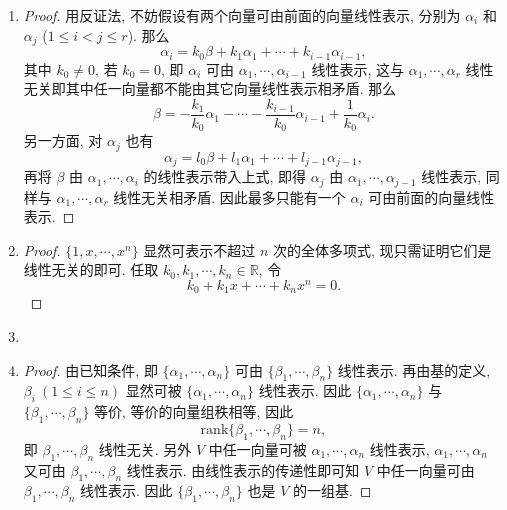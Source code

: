 \documentclass[a4paper, 11pt]{ctexart}
\begin{document}
\begin{enumerate}
    \item %
        \begin{proof}
            用反证法, 不妨假设有两个向量可由前面的向量线性表示, 分别为 $\alpha_i$ 和 $\alpha_j$ ($1 \leq i < j \leq r$). 那么
            \[
                \alpha_i = k_0\beta + k_1\alpha_1 + \cdots + k_{i-1}\alpha_{i-1},    
            \]
            其中 $k_0 \not= 0$, 若 $k_0 = 0$, 即 $\alpha_i$ 可由 $\alpha_1, \cdots, \alpha_{i-1}$ 线性表示,
            这与 $\alpha_1, \cdots, \alpha_r$ 线性无关即其中任一向量都不能由其它向量线性表示相矛盾.
            那么
            \[
                \beta = - \frac{k_1}{k_0}\alpha_1 - \cdots - \frac{k_{i-1}}{k_0}\alpha_{i-1} + \frac{1}{k_0}\alpha_i.
            \]
            另一方面, 对 $\alpha_j$ 也有
            \[
                \alpha_j = l_0\beta + l_1\alpha_1 + \cdots + l_{j-1}\alpha_{j-1},    
            \]
            再将 $\beta$ 由 $\alpha_1, \cdots, \alpha_i$ 的线性表示带入上式, 即得 $\alpha_j$ 由 $\alpha_1, \cdots, \alpha_{j-1}$ 线性表示, 同样与 $\alpha_1, \cdots, \alpha_r$ 线性无关相矛盾.
            因此最多只能有一个 $\alpha_i$ 可由前面的向量线性表示.
        \end{proof}
    \item %
        \begin{proof}
            $\{1, x, \cdots, x^n\}$ 显然可表示不超过 $n$ 次的全体多项式, 现只需证明它们是线性无关的即可. 任取 $k_0, k_1, \cdots, k_n \in \mathbb{R}$, 令
            \[
                k_0 + k_1x + \cdots + k_nx^n = 0.    
            \]
        \end{proof}
    \item %
    \item %
        \begin{proof}
            由已知条件, 即 $\{\alpha_1, \cdots, \alpha_n\}$ 可由 $\{\beta_1, \cdots, \beta_n\}$ 线性表示. 再由基的定义, $\beta_i\ (1\leq i \leq n)$ 显然可被 $\{\alpha_1, \cdots, \alpha_n\}$ 线性表示.
            因此 $\{\alpha_1, \cdots, \alpha_n\}$ 与 $\{\beta_1, \cdots, \beta_n\}$ 等价, 等价的向量组秩相等, 因此
            \[
                \mathrm{rank}\{\beta_1, \cdots, \beta_n\} = n,
            \]
            即 $\beta_1, \cdots, \beta_n$ 线性无关. 另外 $V$ 中任一向量可被 $\alpha_1, \cdots, \alpha_n$ 线性表示, $\alpha_1, \cdots, \alpha_n$ 又可由 $\beta_1, \cdots, \beta_n$ 线性表示.
            由线性表示的传递性即可知 $V$ 中任一向量可由 $\beta_1, \cdots, \beta_n$ 线性表示. 因此 $\{\beta_1, \cdots, \beta_n\}$ 也是 $V$ 的一组基.
        \end{proof}

\end{enumerate}
\end{document}
